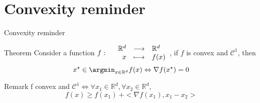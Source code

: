 \documentclass[unknownkeysallowed]{beamer}
\begin{document}
\section{Convexity reminder}
\label{sec:Convexity reminder}


\begin{frame}{Convexity reminder}
\begin{alertblock}{Theorem}
Consider a function $f :
\begin{array}{l rcl}
 & \mathbb{R}^d & \longrightarrow & \mathbb{R}^d \\
    & x & \longmapsto & f(x)
\end{array}$, if $f$ is convex and $\mathcal{C}^1$, then
    $$x^{\star} \in \argmin_{x \in \mathbb{R}^d } f(x) \Leftrightarrow \nabla f(x^{\star}) = 0$$
\end{alertblock}
\vspace{0.4cm}
\begin{block}{Remark}
f convex and $\mathcal{C}^1 \Leftrightarrow \forall x_1 \in \mathbb{R}^d, \forall x_2 \in \mathbb{R}^d$,
 $$f(x) \geq f(x_1) \   + <\nabla f(x_1), x_1-x_2>$$
\end{block}
\end{frame}







\end{document}
